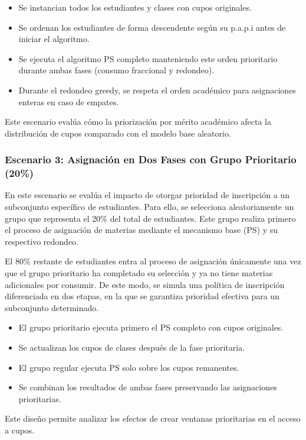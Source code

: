\documentclass{article}
\begin{document}
 \begin{itemize}
 \item Se instancian todos los estudiantes y clases con cupos originales.
 \item Se ordenan los estudiantes de forma descendente según su p.a.p.i antes de iniciar el algoritmo.
 \item Se ejecuta el algoritmo PS completo manteniendo este orden prioritario durante ambas fases (consumo fraccional y redondeo).
 \item Durante el redondeo greedy, se respeta el orden académico para asignaciones enteras en caso de empates.
 \end{itemize}
 
 Este escenario evalúa cómo la priorización por mérito académico afecta la distribución de cupos comparado con el modelo base aleatorio.

\subsubsection{Escenario 3: Asignación en Dos Fases con Grupo Prioritario (20\%)}
En este escenario se evalúa el impacto de otorgar prioridad de inscripción a un subconjunto 
específico de estudiantes. Para ello, se selecciona aleatoriamente un grupo que representa el 
20\% del total de estudiantes. Este grupo realiza primero el proceso de asignación de materias 
mediante el mecanismo base (PS) y su respectivo redondeo.

El 80\% restante de estudiantes entra al proceso de asignación únicamente una vez que el grupo 
prioritario ha completado su selección y ya no tiene materias adicionales por consumir. 
De este modo, se simula una política de inscripción diferenciada en dos etapas, en la que se 
garantiza prioridad efectiva para un subconjunto determinado.


\begin{itemize}
\item El grupo prioritario ejecuta primero el PS completo con cupos originales.
\item Se actualizan los cupos de clases después de la fase prioritaria.
\item El grupo regular ejecuta PS solo sobre los cupos remanentes.
\item Se combinan los resultados de ambas fases preservando las asignaciones prioritarias.
\end{itemize}

Este diseño permite analizar los efectos de crear ventanas prioritarias en el acceso a cupos.
\end{document}

